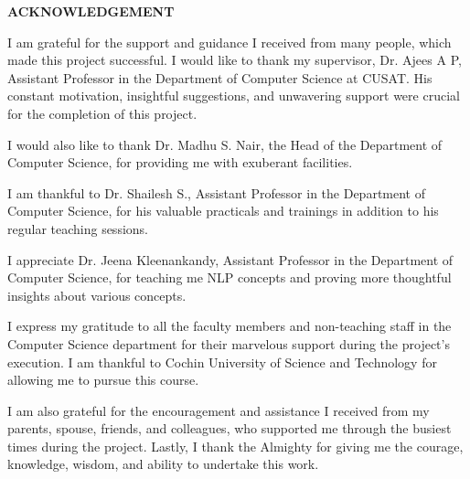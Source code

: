 \thispagestyle{empty}
\begin{center}
    \Large \bfseries  {ACKNOWLEDGEMENT} \\[1cm] 
\end{center}

\vspace{2\baselineskip}

\noindent
\par
I am grateful for the support and guidance I received from many people, which made this project successful. I would like to thank my supervisor, Dr. Ajees A P, Assistant Professor in the Department of Computer Science at CUSAT. His constant motivation, insightful suggestions, and unwavering support were crucial for the completion of this project. \par

 I would also like to thank Dr. Madhu S. Nair, the Head of the Department of Computer Science, for providing me with exuberant facilities. 
 
 \par I am thankful to Dr. Shailesh S., Assistant Professor in the Department of Computer Science, for his valuable practicals and trainings in addition to his regular teaching sessions.
 
 \par I appreciate Dr. Jeena Kleenankandy, Assistant Professor in the Department of Computer Science, for teaching me NLP concepts and proving more thoughtful insights about various concepts. 
 
 \par I express my gratitude to all the faculty members and non-teaching staff in the Computer Science department for their marvelous support during the project's execution. I am thankful to Cochin University of Science and Technology for allowing me to pursue this course. 
 
 \par I am also grateful for the encouragement and assistance I received from my parents, spouse, friends, and colleagues, who supported me through the busiest times during the project. Lastly, I thank the Almighty for giving me the courage, knowledge, wisdom, and ability to undertake this work.

\vspace{1\baselineskip}
\noindent
\myname 

